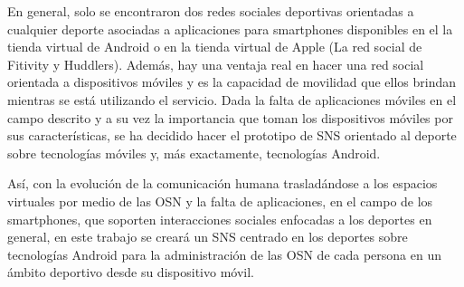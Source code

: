 En general, solo se encontraron dos redes sociales deportivas orientadas a cualquier deporte asociadas a aplicaciones para smartphones disponibles en el la tienda virtual de Android o en la tienda virtual de Apple (La red social de Fitivity y Huddlers). Además, hay una ventaja real en hacer una red social orientada a dispositivos móviles y es la capacidad de movilidad que ellos brindan mientras se está utilizando el servicio\cite[pag.1]{spiderweb}. Dada la falta de aplicaciones móviles en el campo descrito y a su vez la importancia que toman los dispositivos móviles por sus características, se ha decidido hacer el prototipo de SNS orientado al deporte sobre tecnologías móviles y, más exactamente, tecnologías Android.

Así, con la evolución de la comunicación humana trasladándose a los espacios virtuales por medio de las OSN y la falta de aplicaciones, en el campo de los smartphones, que soporten interacciones sociales enfocadas a los deportes en general, en este trabajo se creará un SNS centrado en los deportes sobre tecnologías Android para la administración de las OSN de cada persona en un ámbito deportivo desde su dispositivo móvil.

